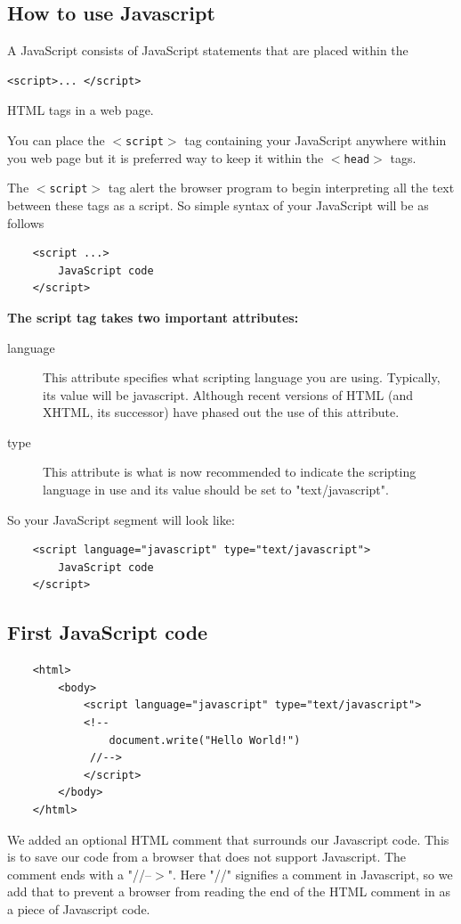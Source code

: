 \documentclass[11pt,a4paper]{article}
\begin{document}
\subsection*{How to use Javascript}
A JavaScript consists of JavaScript statements that are placed within the \begin{verbatim}<script>... </script>\end{verbatim} HTML tags in a web page.

You can place the \texttt{$<$script$>$} tag containing your JavaScript anywhere within you web page but it is preferred way to keep it within the \texttt{$<$head$>$} tags.

The \texttt{$<$script$>$} tag alert the browser program to begin interpreting all the text between these tags as a script. So simple syntax of your JavaScript will be as follows
\begin{verbatim}
    <script ...>
        JavaScript code
    </script>
\end{verbatim}

\textbf{The script tag takes two important attributes:}
\begin{description}
\item[language] This attribute specifies what scripting language you are using. Typically, its value will be javascript. Although recent versions of HTML (and XHTML, its successor) have phased out the use of this attribute.
\item[type] This attribute is what is now recommended to indicate the scripting language in use and its value should be set to "text/javascript".
\end{description}

So your JavaScript segment will look like:
\begin{verbatim}
    <script language="javascript" type="text/javascript">
        JavaScript code
    </script>
\end{verbatim}

\subsection*{First JavaScript code}
\begin{verbatim}
    <html>
        <body>
            <script language="javascript" type="text/javascript">
            <!--
                document.write("Hello World!")
             //-->
            </script>
        </body>
    </html>
\end{verbatim}
We added an optional HTML comment that surrounds our Javascript code. This is to save our code from a browser that does not support Javascript. The comment ends with a "//--$>$". Here "//" signifies a comment in Javascript, so we add that to prevent a browser from reading the end of the HTML comment in as a piece of Javascript code.
\end{document}
